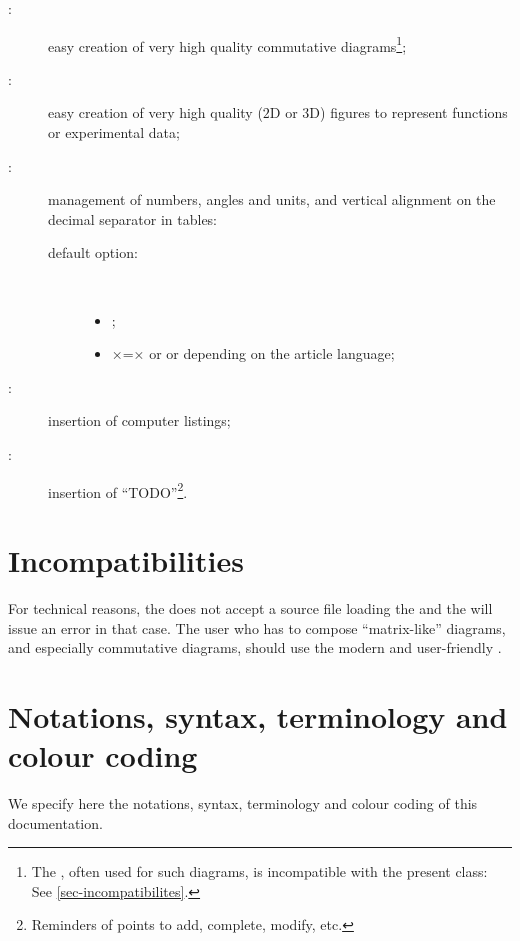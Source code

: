 \documentclass[english,nolocaltoc]{nwejmart}
\newtheorem[style=definition]{fact}
\newtheorem[title-plural=Criteria]{criterion}
\newtheorem[title=random experiment]{rexp}
\begin{document}
\begin{description}
\item[:] easy creation of very high quality
  commutative diagrams\footnote{The , often used for such
    diagrams, is incompatible with the  present class:
    See \vref{sec-incompatibilites}.};
\item[:] easy creation of very high quality ($2$D
  or $3$D) figures to represent functions or experimental data;
\item[:] management of numbers, angles and units, and vertical
  alignment on the  decimal separator in tables:
  \begin{description}
  \item[default option:]\
    \begin{itemize}
    \item {};
    \item {}×=× or  or 
      depending on the article language;
    \end{itemize}
  \end{description}
\item[:] insertion of computer listings;
\item[:] insertion of
  \enquote{TODO}\footnote{Reminders of points to add, complete,
    modify, etc.}.
\end{description}

\section{Incompatibilities}
\label{sec-incompatibilites}

For technical reasons, the \nwejm{} does not accept a 
source file loading the \Package{xy} and the  \nwejmauthor{} will
issue an error in that case. The user who has to compose
\enquote{matrix-like} diagrams, and especially commutative diagrams,
should use the modern and user-friendly \Package{tikz-cd}.

\section{Notations, syntax, terminology and colour coding}\label{sec-synt-term-notat}

We specify here the  notations, syntax, terminology and colour coding
of this documentation.
\end{document}
